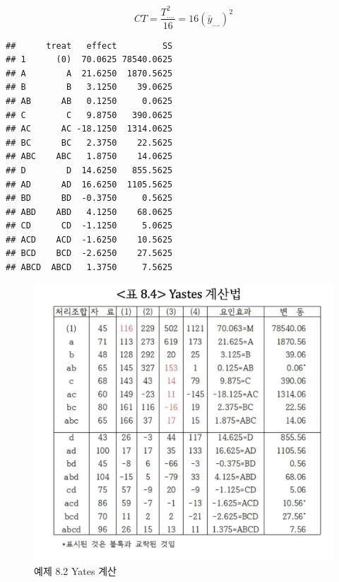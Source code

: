 \documentclass[
]{book}
\newenvironment{Shaded}{\begin{snugshade}}{\end{snugshade}}
\newcommand{\DecValTok}[1]{\textcolor[rgb]{0.00,0.00,0.81}{#1}}
\newcommand{\NormalTok}[1]{#1}
\newcommand{\OtherTok}[1]{\textcolor[rgb]{0.56,0.35,0.01}{#1}}
\newcommand{\SpecialCharTok}[1]{\textcolor[rgb]{0.00,0.00,0.00}{#1}}
\begin{document}
\[ CT = \frac{T_{....}^2}{16} = 16 (\bar y_{....})^2\]

\begin{Shaded}
\end{Shaded}

\begin{verbatim}
##      treat   effect         SS
## 1      (0)  70.0625 78540.0625
## A        A  21.6250  1870.5625
## B        B   3.1250    39.0625
## AB      AB   0.1250     0.0625
## C        C   9.8750   390.0625
## AC      AC -18.1250  1314.0625
## BC      BC   2.3750    22.5625
## ABC    ABC   1.8750    14.0625
## D        D  14.6250   855.5625
## AD      AD  16.6250  1105.5625
## BD      BD  -0.3750     0.5625
## ABD    ABD   4.1250    68.0625
## CD      CD  -1.1250     5.0625
## ACD    ACD  -1.6250    10.5625
## BCD    BCD  -2.6250    27.5625
## ABCD  ABCD   1.3750     7.5625
\end{verbatim}

\begin{figure}

{\centering \includegraphics[width=0.8\linewidth]{images/ex82-yates} 

}

\caption{예제 8.2 Yates 계산}\label{fig:unnamed-chunk-12}
\end{figure}
\end{document}
